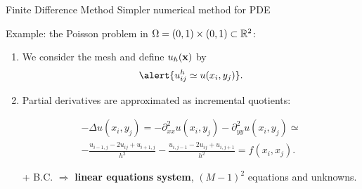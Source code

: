 \begin{frame}{ Finite Difference Method}
Simpler numerical method for PDE

Example: the \alert{Poisson problem} in
$\Omega=(0,1)\times (0,1) \subset{\mathbb R}^2$:

\begin{enumerate}
  \setlength\itemsep{1.1em}
\item We consider the mesh 
and \alert{define $u_h(\mathbf{x})$ by} 
$$
\alert{u^h_{ij}\simeq u(x_i,y_j)}.
$$
\item Partial derivatives are approximated  as incremental quotients:
  \begin{BlockNoTitle}
    \vspace{-1.5em}
    \begin{multline*}
      -\Delta u(x_i,y_j) = -\partial^2_{xx}u(x_i,y_j)
      -\partial^2_{yy}u(x_i,y_j)\simeq
      \\
      -\frac{u_{i-1,j}-2u_{ij}+u_{i+1,j}}{h^2}
      -\frac{u_{i,j-1}-2u_{ij}+u_{i,j+1}}{h^2} = f(x_i,x_j).
    \end{multline*}
  \end{BlockNoTitle}
  + B.C. $\Rightarrow$ \textbf{linear equations system}, $(M-1)^2$ equations and unknowns.
\end{enumerate}

\end{frame}

